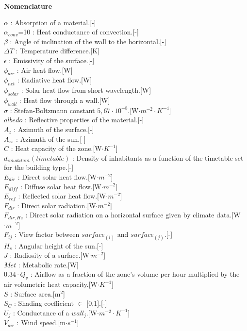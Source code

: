 \documentclass[runningheads]{llncs}
\begin{document}
\textbf{Nomenclature}\\
\begin{multicols}{2}
$\alpha$ : Absorption of a material.\hfill[-]\\
$\alpha_{conv}$=10 : Heat conductance of convection.\hfill[-]\\
$\beta$ : Angle of inclination of the wall to the horizontal.\hfill[-]\\
$\Delta T$ : Temperature difference.\hfill[K]\\
$\epsilon$ : Emissivity of the surface.\hfill[-]\\
$\phi_{air}$ : Air heat flow.\hfill[W]\\
$\phi_{net}$ : Radiative heat flow.\hfill[W]\\
$\phi_{solar}$ : Solar heat flow from short wavelength.\hfill[W]\\
$\phi_{wall}$ : Heat flow through a wall.\hfill[W]\\
$\sigma$ : Stefan-Boltzmann constant $5,67\cdot10^{-8}$.\hfill[W$\cdot m^{-2}\cdot K^{-4}$]\\
$albedo$ : Reflective properties of the material.\hfill[-]\\
$A_z$ : Azimuth of the surface.\hfill[-]\\
$A_{zs}$ : Azimuth of the sun.\hfill[-]\\
$C$ : Heat capacity of the zone.\hfill[W$\cdot K^{-1}$]\\
$d_{inhabitant}(timetable)$ : Density of inhabitants as a function of the timetable set for the building type.\hfill[-]\\
$E_{dir}$ : Direct solar heat flow.\hfill[W$\cdot m^{-2}$]\\
$E_{diff}$ : Diffuse solar heat flow.\hfill[W$\cdot m^{-2}$]\\
$E_{ref}$ : Reflected solar heat flow.\hfill[W$\cdot m^{-2}$]\\
$F_{dir}$ : Direct solar radiation.\hfill[W$\cdot m^{-2}$]\\
$F_{dir,Hz}$ : Direct solar radiation on a horizontal surface given by climate data.\hfill[W$\cdot m^{-2}$]\\
$F_{ij}$ : View factor between $surface_{(i)}$ and $surface_{(j)}$.\hfill[-]\\
$H_s$ : Angular height of the sun.\hfill[-]\\
$J$ : Radiosity of a surface.\hfill[W$\cdot m^{-2}$]\\
$Met$ : Metabolic rate.\hfill[W]\\
$0.34\cdot Q_v$ : Airflow as a fraction of the zone's volume per hour multiplied by the air volumetric heat capacity.\hfill[W$\cdot K^{-1}$]\\
$S$ : Surface area.\hfill[m$^2$]\\
$S_C$ : Shading coefficient $\in$ [0,1].\hfill[-]\\
$U_j$ : Conductance of a $wall_j$.\hfill[W$\cdot m^{-2}\cdot K^{-1}$]\\
$V_{air}$ : Wind speed.\hfill[m$\cdot s^{-1}$]
\end{multicols}



\end{document}
